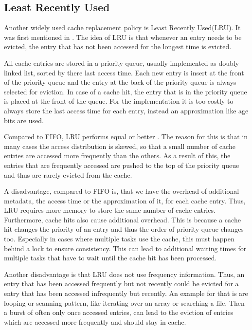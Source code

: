\documentclass[
	12pt,
	a4paper,
	abstract,
	bibliography=totoc,
	chapterprefix,
	headings=openright,
	numbers=endperiod,
	parskip=half,
	twoside,
]{scrreprt}
\begin{document}
\subsection{Least Recently Used}
Another widely used cache replacement policy is Least Recently Used(LRU).
It was first mentioned in \cite{denning1980working}.
The idea of LRU is that whenever an entry needs to be evicted, the entry that has not been accessed for the longest time is evicted.

All cache entries are stored in a priority queue, usually implemented as doubly linked list, sorted by there last access time.
Each new entry is insert at the front of the priority queue and the entry at the back of the priority queue is always selected for eviction.
In case of a cache hit, the entry that is in the priority queue is placed at the front of the queue.
For the implementation it is too costly to always store the last access time for each entry, instead an 
approximation like age bits are used.


Compared to FIFO, LRU performs equal or better \cite{van1992lru}.
The reason for this is that in many cases the access distribution is skewed, so that a small number of cache entries are accessed more frequently than the others.
As a result of this, the entries that are frequently accessed are pushed to the top of the priority queue and thus are rarely evicted from the cache.

A disadvantage, compared to FIFO is, that we have the overhead of additional metadata, the access time or the approximation of it, for each cache entry.
Thus, LRU requires more memory to store the same number of cache entries.
Furthermore, cache hits also cause additional overhead. 
This is because a cache hit changes the priority of an entry and thus the order of priority queue changes too.
Especially in cases where multiple tasks use the cache, this must happen behind a lock to ensure consistency.
This can lead to additional waiting times for multiple tasks that have to wait until the cache hit has been processed.

Another disadvantage is that LRU does not use frequency information.
Thus, an entry that has been accessed frequently but not recently could be evicted for a entry that has been accessed infrequently but recently.
An example for that is are looping or scanning pattern, like iterating over an array or searching a file.
Then a burst of often only once accessed entries, can lead to the eviction of entries which are accessed more frequently and should stay in cache.
\end{document}
